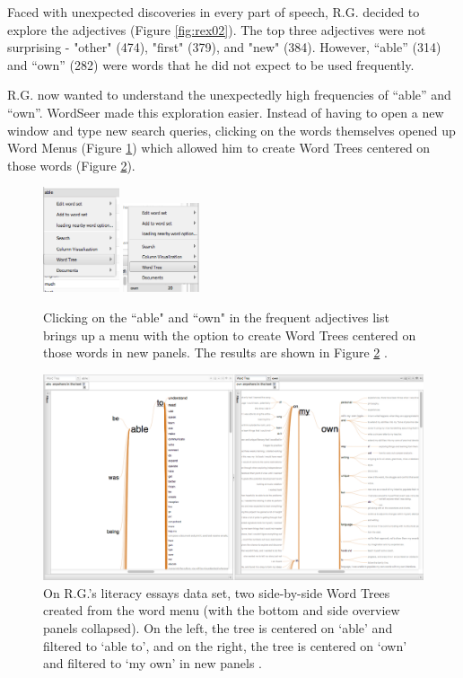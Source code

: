 \documentclass{sig-alternate}
\begin{document}
Faced with unexpected discoveries in every part of speech, R.G. decided to explore the adjectives (Figure \ref{fig:rex02}). The top three adjectives were not surprising - "other" (474), "first" (379), and "new" (384).  However,  ``able'' (314) and ``own'' (282) were words that he did not expect to be used frequently.

R.G. now wanted to understand the unexpectedly high frequencies of ``able'' and ``own''. WordSeer made this exploration easier. Instead of having to open a new window and type new search queries, clicking on the words themselves opened up Word Menus (Figure \ref{fig:rex03}) which allowed him to create Word Trees centered on those words (Figure \ref{fig:rex04}).   
\begin{figure}[h!]
\includegraphics[width=0.2\textwidth]{fig/rex/03.png}
\includegraphics[width=0.2\textwidth]{fig/rex/03b.png}
\caption{Clicking on the ``able" and ``own" in the frequent adjectives list brings up a menu with the option to create Word Trees centered on those words in new panels. The results are shown in Figure \ref{fig:rex04} \label{fig:rex03}.}
\end{figure}

\begin{figure}[h!]
\includegraphics[width=\textwidth]{fig/rex/04.png}
\caption{ On R.G.'s literacy essays data set, two side-by-side Word Trees created from the word menu (with the bottom and side overview panels collapsed). On the left, the tree is centered on `able' and filtered to `able to', and on the right, the tree is centered on  `own' and filtered to `my own' in new panels \label{fig:rex04}.}
\end{figure}
\end{document}
